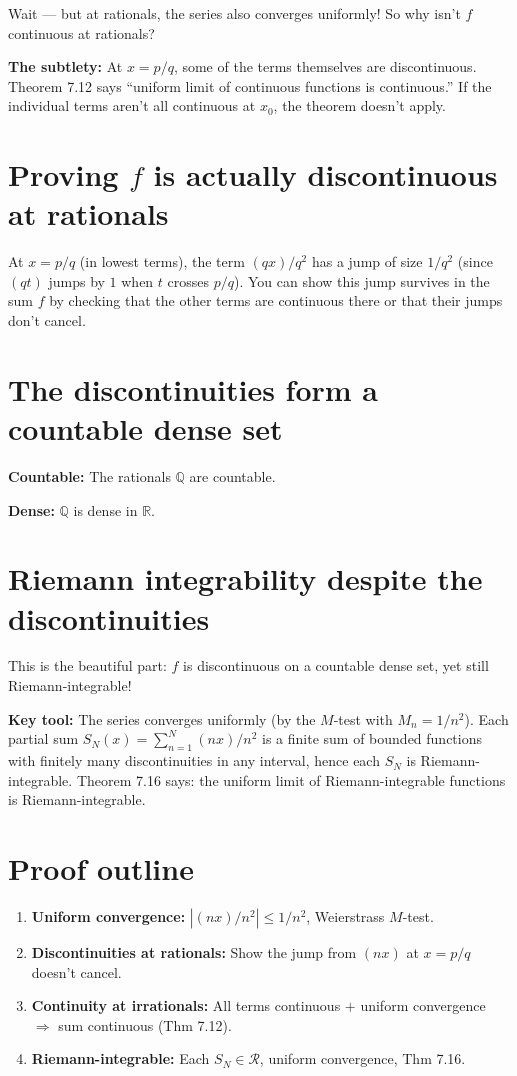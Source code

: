 \documentclass[12pt]{article}
\begin{document}
Wait --- but at rationals, the series also converges uniformly! So why isn't $f$ continuous at rationals?

\textbf{The subtlety:} At $x = p/q$, some of the terms themselves are discontinuous. Theorem 7.12 says ``uniform limit of continuous functions is continuous.'' If the individual terms aren't all continuous at $x_0$, the theorem doesn't apply.

\section*{Proving $f$ is actually discontinuous at rationals}

At $x = p/q$ (in lowest terms), the term $(qx)/q^2$ has a jump of size $1/q^2$ (since $(qt)$ jumps by $1$ when $t$ crosses $p/q$). You can show this jump survives in the sum $f$ by checking that the other terms are continuous there or that their jumps don't cancel.

\section*{The discontinuities form a countable dense set}

\textbf{Countable:} The rationals $\mathbb{Q}$ are countable.

\textbf{Dense:} $\mathbb{Q}$ is dense in $\mathbb{R}$.

\section*{Riemann integrability despite the discontinuities}

This is the beautiful part: $f$ is discontinuous on a countable dense set, yet still Riemann-integrable!

\textbf{Key tool:} The series converges uniformly (by the $M$-test with $M_n = 1/n^2$). Each partial sum $S_N(x) = \sum_{n=1}^N (nx)/n^2$ is a finite sum of bounded functions with finitely many discontinuities in any interval, hence each $S_N$ is Riemann-integrable. Theorem 7.16 says: the uniform limit of Riemann-integrable functions is Riemann-integrable.

\section*{Proof outline}
\begin{enumerate}
    \item \textbf{Uniform convergence:} $|(nx)/n^2| \leq 1/n^2$, Weierstrass $M$-test.
    \item \textbf{Discontinuities at rationals:} Show the jump from $(nx)$ at $x = p/q$ doesn't cancel.
    \item \textbf{Continuity at irrationals:} All terms continuous $+$ uniform convergence $\Rightarrow$ sum continuous (Thm 7.12).
    \item \textbf{Riemann-integrable:} Each $S_N \in \mathscr{R}$, uniform convergence, Thm 7.16.
\end{enumerate}
\end{document}
